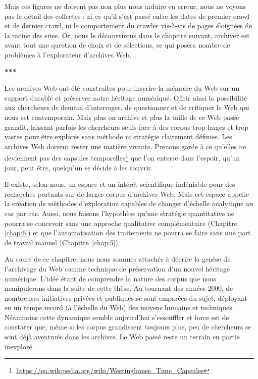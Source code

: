 \documentclass[symmetric,justified,marginals=raggedouter]{tufte-book}
\begin{document}
Mais ces figures ne doivent pas non plus nous induire en erreur, nous ne voyons pas le détail des collectes : ni ce qu'il s'est passé entre les dates de premier crawl et de dernier crawl, ni le comportement du crawler vis-à-vis de pages éloignées de la racine des sites. Or, nous le découvrirons dans le chapitre suivant, archiver est avant tout une question de choix et de sélections, ce qui posera nombre de problèmes à l'explorateur d'archives Web. 

\begin{center}
	\textbf{***}
\end{center}

\noindent Les archives Web ont été construites pour inscrire la mémoire du Web sur un support durable et préserver notre héritage numérique. Offrir ainsi la possibilité aux chercheurs de demain d'interroger, de questionner et de critiquer le Web qui nous est contemporain. Mais plus on archive et plus la taille de ce Web passé grandit, laissant parfois les chercheurs seuls face à des corpus trop larges et trop vastes pour être explorés sans méthode ni stratégie clairement définies. Les archives Web doivent rester une matière vivante. Prenons garde à ce qu'elles ne deviennent pas des capsules temporelles\footnote{\RaggedOuter \url{https://en.wikipedia.org/wiki/Westinghouse\_Time\_Capsules}} que l'on enterre dans l'espoir, qu'un jour, peut être, quelqu'un se décide à les rouvrir.

Il existe, selon nous, un espace et un intérêt scientifique indéniable pour des recherches portants sur de larges corpus d'archives Web. Mais cet espace appelle la création de méthodes d'exploration capables de changer d'échelle analytique au cas par cas. Aussi, nous faisons l'hypothèse qu'une stratégie quantitative ne pourra se concevoir sans une approche qualitative complémentaire (Chapitre \ref{chap:6}) et que l'automatisation des traitements ne pourra se faire sans une part de travail manuel (Chapitre~\ref{chap:5}).

Au cours de ce chapitre, nous nous sommes attachés à décrire la genèse de l'archivage du Web comme technique de préservation d'un nouvel héritage numérique. L'idée étant de comprendre la nature des corpus que nous manipulerons dans la suite de cette thèse. Au tournant des années 2000, de nombreuses initiatives privées et publiques se sont emparées du sujet, déployant en un temps record (à l'échelle du Web) des moyens humains et techniques. Néanmoins cette dynamique semble aujourd'hui s'essouffler et force est de constater que, même si les corpus grandissent toujours plus, peu de chercheurs se sont déjà aventurés dans les archives. Le Web passé reste un terrain en partie inexploré. 
\end{document}
